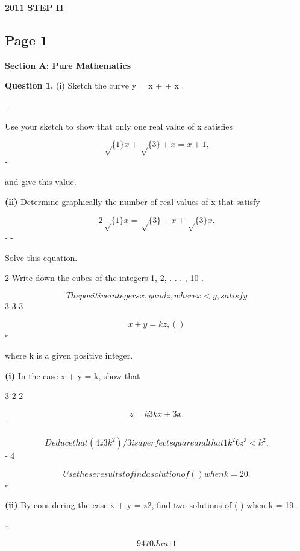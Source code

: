 \documentclass[12pt]{article}
\begin{document}
\begin{center}
{\Large \textbf{2011 STEP II}}
\end{center}

\subsection*{Page 1}
\begin{flushleft}
\bigskip\textbf{Section A: Pure Mathematics}\par
\bigskip\textbf{Question 1.} (i) Sketch the curve y =  x +  + x .\par
-\par
Use your sketch to show that only one real value of x satisfies\par
\[\sqrt\{1\} x + \sqrt\{3\} + x = x + 1 ,\]
-\par
and give this value.\par
\textbf{(ii)} Determine graphically the number of real values of x that satisfy\par
\[2\sqrt\{1\} x = \sqrt\{3\} + x + \sqrt\{3\} x .\]
- -\par
Solve this equation.\par
2 Write down the cubes of the integers 1, 2, . . . , 10 .\par
\[The positive integers x, y and z, where x < y, satisfy\]
3 3 3\par
\[x + y = kz , ( )\]
∗\par
where k is a given positive integer.\par
\textbf{(i)} In the case x + y = k, show that\par
3 2 2\par
\[z = k 3kx + 3x .\]
-\par
\[Deduce that (4z3 k^2)/3 is a perfect square and that 1 k^2 6 z^3 < k^2 .\]
- 4\par
\[Use these results to find a solution of ( ) when k = 20.\]
∗\par
\textbf{(ii)} By considering the case x + y = z2, find two solutions of ( ) when k = 19.\par
∗\par
\[9470 Jun11\]
\end{flushleft}
\end{document}
